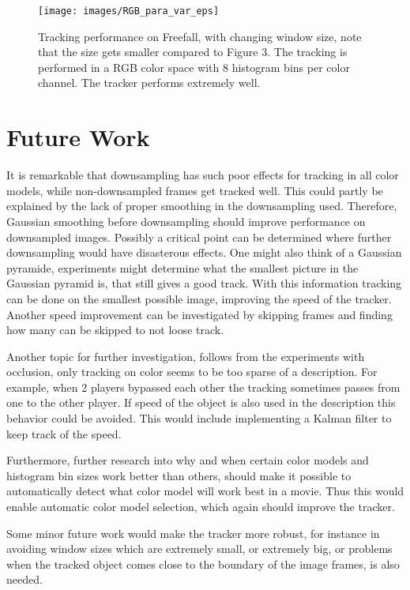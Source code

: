\documentclass[a4paper,11pt]{article}
\begin{document}
\begin{figure}[!ht]
\label{fig:para_var}
\centering
\texttt{[image: images/RGB\_para\_var\_eps]}
\caption{Tracking performance on Freefall, with changing window size, note that the size gets smaller compared to Figure 3. The tracking is performed in a RGB color space with 8 histogram bins per color channel. The tracker performs extremely well.}
\end{figure}

\section{Future Work} \label{sec:fut}
It is remarkable that downsampling has such poor effects for tracking in all color models, while non-downsampled frames get tracked well. This could partly be explained by the lack of proper smoothing in the downsampling used. Therefore, Gaussian smoothing before downsampling should improve performance on downsampled images. Possibly a critical point can be determined where further downsampling would have disasterous effects. One might also think of a Gaussian pyramide, experiments might determine what the smallest picture in the Gaussian pyramid is, that still gives a good track. With this information tracking can be done on the smallest possible image, improving the speed of the tracker. Another speed improvement can be investigated by skipping frames and finding how many can be skipped to not loose track.
 
Another topic for further investigation, follows from the experiments with occlusion, only tracking on color seems to be too sparse of a description. For example, when 2 players bypassed each other the tracking sometimes passes from one to the other player. If speed of the object is also used in the description this behavior could be avoided. This would include implementing a Kalman filter to keep track of the speed. 

Furthermore, further research into why and when certain color models and histogram bin sizes work better than others, should make it possible to automatically detect what color model will work best in a movie. Thus this would enable automatic color model selection, which again should improve the tracker.

Some minor future work would make the tracker more robust, for instance in avoiding window sizes which are extremely small, or extremely big, or problems when the tracked object comes close to the boundary of the image frames, is also needed.
\end{document}
